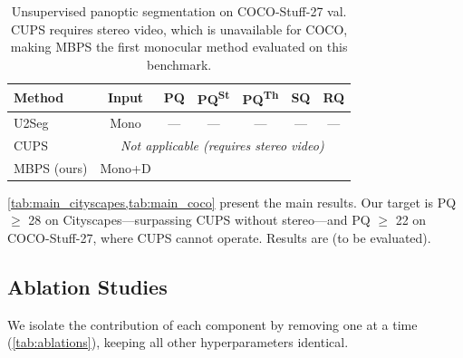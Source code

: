\documentclass[10pt,twocolumn,letterpaper]{article}
\begin{document}
\begin{table}[t]
\centering
\caption{Unsupervised panoptic segmentation on COCO-Stuff-27 val. CUPS requires stereo video, which is unavailable for COCO, making MBPS the first monocular method evaluated on this benchmark.}
\label{tab:main_coco}
\setlength{\tabcolsep}{2.5pt}
\begin{tabular}{lcccccc}
\toprule
Method & Input & PQ & PQ\textsuperscript{St} & PQ\textsuperscript{Th} & SQ & RQ \\
\midrule
U2Seg~\cite{niu2024u2seg} & Mono & --- & --- & --- & --- & --- \\
CUPS~\cite{hahn2025cups} & \multicolumn{6}{c}{\emph{Not applicable (requires stereo video)}} \\
\midrule
MBPS (ours) & Mono+D & \underline{\hspace{1.5em}} & \underline{\hspace{1.5em}} & \underline{\hspace{1.5em}} & \underline{\hspace{1.5em}} & \underline{\hspace{1.5em}} \\
\bottomrule
\end{tabular}
\end{table}

\cref{tab:main_cityscapes,tab:main_coco} present the main results. Our target is PQ $\geq$ 28 on Cityscapes---surpassing CUPS without stereo---and PQ $\geq$ 22 on COCO-Stuff-27, where CUPS cannot operate. Results are \underline{\hspace{2em}} (to be evaluated).


\subsection{Ablation Studies}

We isolate the contribution of each component by removing one at a time (\cref{tab:ablations}), keeping all other hyperparameters identical.
\end{document}
